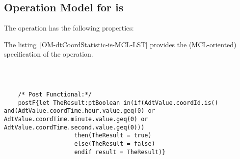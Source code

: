 \subsection{Operation Model for is}

\label{OM-is}


The  operation has the following properties:

	\begin{operationmodel}



		


	\end{operationmodel}



	\vspace{1cm}
	The listing~\ref{OM-dtCoordStatistic-is-MCL-LST} provides the \msrmessir (MCL-oriented) specification of the operation.
	
	\scriptsize
	\vspace{0.5cm}
	\begin{lstlisting}[style=MessirStyle,firstnumber=auto,captionpos=b,caption={\msrmessir (MCL-oriented) specification of the operation \emph{is}.},label=OM-dtCoordStatistic-is-MCL-LST]

	
	
	/* Post Functional:*/ 
	postF{let TheResult:ptBoolean in(if(AdtValue.coordId.is() and(AdtValue.coordTime.hour.value.geq(0) or AdtValue.coordTime.minute.value.geq(0) or AdtValue.coordTime.second.value.geq(0)))
					then(TheResult = true)
					else(TheResult = false)
					endif result = TheResult)}
	
	
	\end{lstlisting}
	\normalsize 
	
	
	
	





